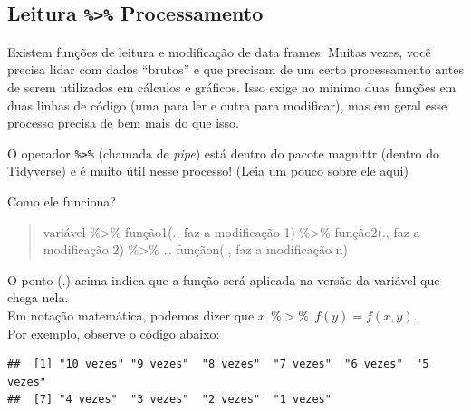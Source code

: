 \documentclass[]{book}
\newenvironment{Shaded}{\begin{snugshade}}{\end{snugshade}}
\newcommand{\KeywordTok}[1]{\textcolor[rgb]{0.13,0.29,0.53}{\textbf{#1}}}
\newcommand{\DataTypeTok}[1]{\textcolor[rgb]{0.13,0.29,0.53}{#1}}
\newcommand{\DecValTok}[1]{\textcolor[rgb]{0.00,0.00,0.81}{#1}}
\newcommand{\StringTok}[1]{\textcolor[rgb]{0.31,0.60,0.02}{#1}}
\newcommand{\OperatorTok}[1]{\textcolor[rgb]{0.81,0.36,0.00}{\textbf{#1}}}
\newcommand{\NormalTok}[1]{#1}
\theoremstyle{definition}
\theoremstyle{definition}
\theoremstyle{definition}
\theoremstyle{remark}
\begin{document}
\subsection{\texorpdfstring{Leitura \texttt{\%\textgreater{}\%}
Processamento}{Leitura \%\textgreater{}\% Processamento}}\label{leitura-processamento}

Existem funções de leitura e modificação de data frames. Muitas vezes,
você precisa lidar com dados ``brutos'' e que precisam de um certo
processamento antes de serem utilizados em cálculos e gráficos. Isso
exige no mínimo duas funções em duas linhas de código (uma para ler e
outra para modificar), mas em geral esse processo precisa de bem mais do
que isso.

O operador \texttt{\%\textgreater{}\%} (chamada de \emph{pipe}) está
dentro do pacote magnittr (dentro do Tidyverse) e é muito útil nesse
processo!
(\href{https://www.datacamp.com/community/tutorials/pipe-r-tutorial}{Leia
um pouco sobre ele aqui})

Como ele funciona?

\begin{quote}
variável \%\textgreater{}\% função1(., faz a modificação 1)
\%\textgreater{}\% função2(., faz a modificação 2) \%\textgreater{}\%
\ldots{} funçãon(., faz a modificação n)
\end{quote}

O ponto (.) acima indica que a função será aplicada na versão da
variável que chega nela.\\
Em notação matemática, podemos dizer que
\(x \ \ \%>\% \ \ f(y) = f(x,y)\).\\
Por exemplo, observe o código abaixo:

\begin{Shaded}
\end{Shaded}

\begin{verbatim}
##  [1] "10 vezes" "9 vezes"  "8 vezes"  "7 vezes"  "6 vezes"  "5 vezes" 
##  [7] "4 vezes"  "3 vezes"  "2 vezes"  "1 vezes"
\end{verbatim}
\end{document}
